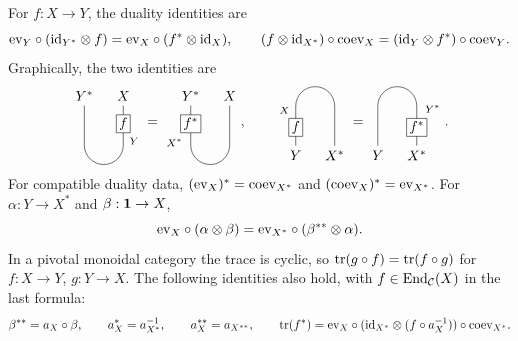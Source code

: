 \documentclass{amsart}
\begin{document}
\begin{lemma}\label{lem:LeftRight}\label{lem:ev*}\label{lem:trans}\label{lem:switch}\label{lem:pivo*}\label{lem:trf*}
For $f:X\to Y$, the duality identities are
\[
 \mathrm{ev}_Y\circ(\mathrm{id}_{Y^*}\otimes f)=\mathrm{ev}_X\circ(f^*\otimes\mathrm{id}_X),\qquad
 (f\otimes\mathrm{id}_{X^*})\circ\mathrm{coev}_X=(\mathrm{id}_Y\otimes f^*)\circ\mathrm{coev}_Y.
\]
Graphically, the two identities are
\[
\begin{tikzpicture}[baseline=(current bounding box.center),scale=.70]
\draw (0,1.23) node[above] {$Y^*$} -- (0,-.2) arc(180:360:.7) -- (1.4,1.23) node[above] {$X$};
\node[draw,fill=white,inner sep=2pt] at (1.4,.57) {$f$};
\node[right=1pt,font=\scriptsize] at (1.4,-.05) {$Y$};
\end{tikzpicture}
=\begin{tikzpicture}[baseline=(current bounding box.center),scale=.70]
\draw (0,1.23) node[above] {$Y^*$} -- (0,-.2) arc(180:360:.7) -- (1.4,1.23) node[above] {$X$};
\node[draw,fill=white,inner sep=2pt] at (0,.57) {$f^*$};
\node[left=2.5pt,font=\scriptsize] at (0,-.105) {$X^*$};
\end{tikzpicture},\qquad
\begin{tikzpicture}[baseline=(current bounding box.center),scale=.70]
\draw (0,-1.23) node[below] {$Y$} -- (0,.2) arc(180:0:.7) -- (1.4,-1.23) node[below] {$X^*$};
\node[draw,fill=white,inner sep=2pt] at (0,-.57) {$f$};
\node[left=1pt,font=\scriptsize] at (0,.05) {$X$};
\end{tikzpicture}
=\begin{tikzpicture}[baseline=(current bounding box.center),scale=.70]
\draw (0,-1.23) node[below] {$Y$} -- (0,.2) arc(180:0:.7) -- (1.4,-1.23) node[below] {$X^*$};
\node[draw,fill=white,inner sep=2pt] at (1.4,-.57) {$f^*$};
\node[right=2.5pt,font=\scriptsize] at (1.4,.105) {$Y^*$};
\end{tikzpicture}.
\]
For compatible duality data, $(\mathrm{ev}_X)^*=\mathrm{coev}_{X^*}$ and
$(\mathrm{coev}_X)^*=\mathrm{ev}_{X^*}$. For $\alpha:Y\to X^*$ and
$\beta:{\bf 1}\to X$,
\begin{equation}\label{eq:dual-transposition}
 \mathrm{ev}_X\circ(\alpha\otimes\beta)
   =\mathrm{ev}_{X^*}\circ(\beta^{**}\otimes\alpha).
\end{equation}
In a pivotal monoidal category the trace is cyclic, so
$\mathrm{tr}(g\circ f)=\mathrm{tr}(f\circ g)$ for $f:X\to Y$, $g:Y\to X$.
The following identities also hold, with $f\in\mathrm{End}_{\mathcal{C}}(X)$ in the last formula:
\begin{equation}\label{eq:pivotal-duality}
 \beta^{**}=a_X\circ\beta,\qquad
 a_X^*=a_{X^*}^{-1},\qquad a_X^{**}=a_{X^{**}},\qquad
 \mathrm{tr}(f^*)=\mathrm{ev}_X\circ(\mathrm{id}_{X^*}\otimes(f\circ a_X^{-1}))\circ\mathrm{coev}_{X^*}.
\end{equation}
\end{lemma}
\end{document}
